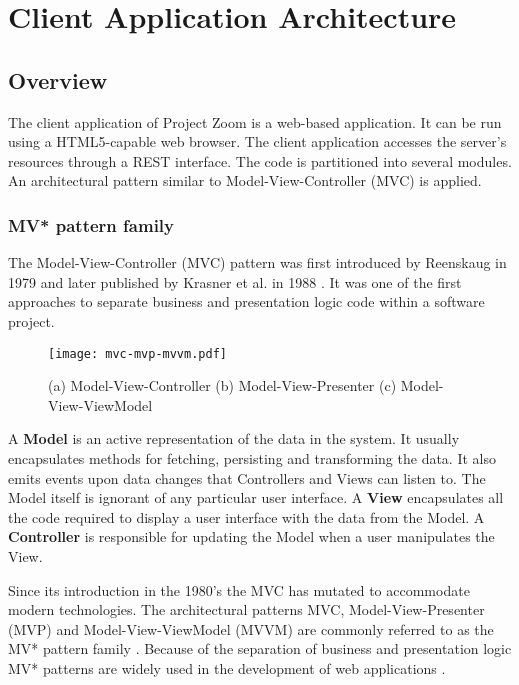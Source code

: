 \chapter{Client Application Architecture}

\section{Overview}
The client application of Project Zoom is a web-based application. It can be run using a HTML5-capable web browser. The client application accesses the server's resources through a REST interface. The code is partitioned into several modules. An architectural pattern similar to Model-View-Controller (MVC) is applied.

\subsection{MV* pattern family}
The Model-View-Controller (MVC) pattern was first introduced by Reenskaug in 1979 \cite{Reenskaug_1979} and later published by Krasner et al. in 1988 \cite{Krasner_1988}. It was one of the first approaches to separate business and presentation logic code within a software project.

\begin{figure}
\texttt{[image: mvc-mvp-mvvm.pdf]}
\caption[Diagrams of Model-View-Controller, Model-View-Presenter and Model-View-ViewModel]{(a) Model-View-Controller \quad (b) Model-View-Presenter \quad (c) Model-View-ViewModel}
\label{fig:MV}
\end{figure}

A \textbf{Model} is an active representation of the data in the system. It usually encapsulates methods for fetching, persisting and transforming the data. It also emits events upon data changes that Controllers and Views can listen to. The Model itself is ignorant of any particular user interface. A \textbf{View} encapsulates all the code required to display a user interface with the data from the Model. A \textbf{Controller} is responsible for updating the Model when a user manipulates the View. \cite{Krasner_1988} \cite{Gamma_1994}

Since its introduction in the 1980's the MVC has mutated to accommodate modern technologies. The architectural patterns MVC, Model-View-Presenter (MVP) and Model-View-ViewModel (MVVM) are commonly referred to as the MV* pattern family \cite{Osmani_2012}. Because of the separation of business and presentation logic MV* patterns are widely used in the development of web applications \cite{Takada_2012}.


